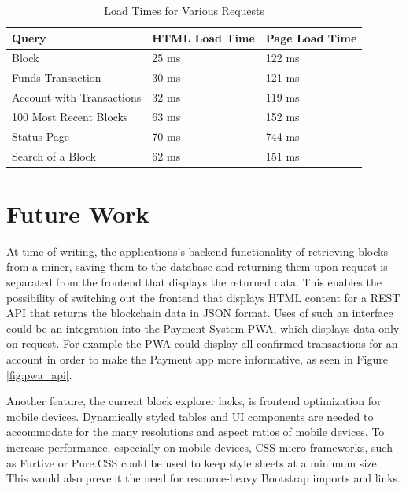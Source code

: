 \begin{table}[]
\centering
\caption{Load Times for Various Requests}
\label{tab:query}
\begin{tabular}{|l|l|l|}
\hline
\textbf{Query}            & \textbf{HTML Load Time} & \textbf{Page Load Time} \\ \hline
Block                     & 25 ms                   & 122 ms                  \\ \hline
Funds Transaction         & 30 ms                   & 121 ms                  \\ \hline
Account with Transactions & 32 ms                   & 119 ms                  \\ \hline
100 Most Recent Blocks    & 63 ms                   & 152 ms                  \\ \hline
Status Page               & 70 ms                   & 744 ms                  \\ \hline
Search of a Block         & 62 ms                   & 151 ms                  \\ \hline
\end{tabular}
\end{table}
\pagebreak

\section{Future Work}
At time of writing, the applications's backend functionality of retrieving blocks from a miner, saving them to the database and returning them upon request is separated from the frontend that displays the returned data. This enables the possibility of switching out the frontend that displays HTML content for a REST API that returns the blockchain data in JSON format. Uses of such an interface could be an integration into the Payment System PWA, which displays data only on request. For example the PWA could display all confirmed transactions for an account in order to make the Payment app more informative, as seen in Figure \ref{fig:pwa_api}.

Another feature, the current block explorer lacks, is frontend optimization for mobile devices. Dynamically styled tables and UI components are needed to accommodate for the many resolutions and aspect ratios of mobile devices. To increase performance, especially on mobile devices, CSS micro-frameworks, such as Furtive \cite{furtive} or Pure.CSS \cite{pure} could be used to keep style sheets at a minimum size. This would also prevent the need for resource-heavy Bootstrap imports and links.
\\
\\
\\

